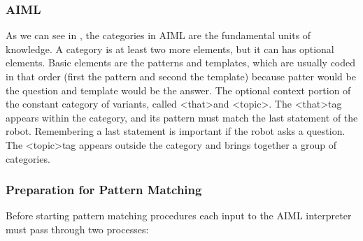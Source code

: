 \documentclass[12pt,twoside]{article}
\theoremstyle{plain}
\theoremstyle{definition}
\theoremstyle{remark}
\begin{document}
\subsubsection{AIML}

	
	As we can see in \cite{wallace2003elements}, the categories in AIML are the fundamental units of knowledge. A category is at least two more elements, but it can has optional elements. Basic elements are the patterns and templates, which are usually coded in that order (first the pattern and second the template) because patter would be the question and template would be the answer. The optional context portion of the constant category of variants, called \textless that\textgreater and \textless topic\textgreater. The \textless that\textgreater tag appears within the category, and its pattern must match the last statement of the robot. Remembering a last statement is important if the robot asks a question. The \textless topic\textgreater tag appears outside the category and brings together a group of categories. 
	

	
\subsubsection{Preparation for Pattern Matching}
	\label{sec:preparation}	
	
	Before starting pattern matching procedures each input to the AIML interpreter must pass through two processes:\\
	
\end{document}
